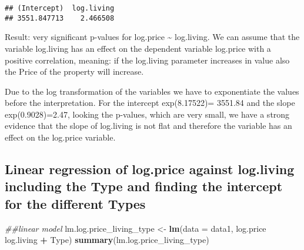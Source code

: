 \documentclass[
]{article}
\newenvironment{Shaded}{\begin{snugshade}}{\end{snugshade}}
\newcommand{\CommentTok}[1]{\textcolor[rgb]{0.56,0.35,0.01}{\textit{#1}}}
\newcommand{\DataTypeTok}[1]{\textcolor[rgb]{0.13,0.29,0.53}{#1}}
\newcommand{\KeywordTok}[1]{\textcolor[rgb]{0.13,0.29,0.53}{\textbf{#1}}}
\newcommand{\NormalTok}[1]{#1}
\newcommand{\OperatorTok}[1]{\textcolor[rgb]{0.81,0.36,0.00}{\textbf{#1}}}
\newcommand{\StringTok}[1]{\textcolor[rgb]{0.31,0.60,0.02}{#1}}
\begin{document}
\begin{verbatim}
## (Intercept)  log.living 
## 3551.847713    2.466508
\end{verbatim}

Result: very significant p-values for log.price \textasciitilde{}
log.living. We can assume that the variable log.living has an effect on
the dependent variable log.price with a positive correlation, meaning:
if the log.living parameter increases in value also the Price of the
property will increase.

Due to the log transformation of the variables we have to exponentiate
the values before the interpretation. For the intercept exp(8.17522)=
3551.84 and the slope exp(0.9028)=2.47, looking the p-values, which are
very small, we have a strong evidence that the slope of log.living is
not flat and therefore the variable has an effect on the log.price
variable.

\hypertarget{linear-regression-of-log.price-against-log.living-including-the-type-and-finding-the-intercept-for-the-different-types}{%
\subsection{Linear regression of log.price against log.living including
the Type and finding the intercept for the different
Types}\label{linear-regression-of-log.price-against-log.living-including-the-type-and-finding-the-intercept-for-the-different-types}}

\begin{Shaded}
\begin{Highlighting}[]
\CommentTok{##linear model}
\NormalTok{lm.log.price_living_type <-}\StringTok{ }\KeywordTok{lm}\NormalTok{(}\DataTypeTok{data =}\NormalTok{ data1, log.price }\OperatorTok{~}\StringTok{ }\NormalTok{log.living }\OperatorTok{+}\StringTok{ }\NormalTok{Type)}
\KeywordTok{summary}\NormalTok{(lm.log.price_living_type)}
\end{Highlighting}
\end{Shaded}
\end{document}
